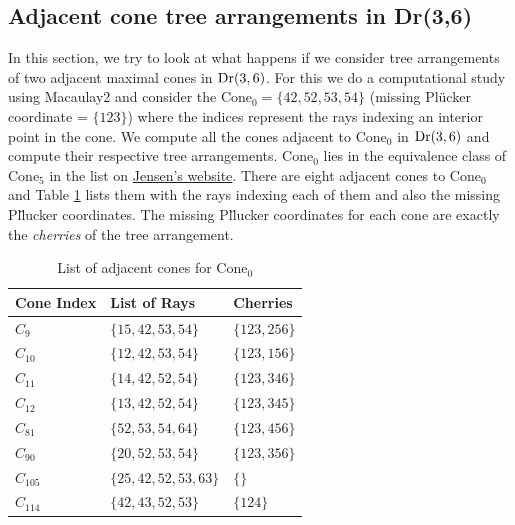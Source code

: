 \documentclass[12pt]{article}
\DeclareMathOperator{\Dr}{\rm Dr}
\theoremstyle{plain}
\theoremstyle{definition}
\numberwithin{subcase}{case}
\begin{document}
\subsection{Adjacent cone tree arrangements in Dr(3,6)}



In this section, we try to look at what happens if we consider tree arrangements of two adjacent maximal cones in $\Dr(3,6)$. For this we do a computational study using Macaulay2 \cite{M2} and consider the Cone$_{0} = \{ 42, 52, 53, 54 \}$ (missing Pl\"ucker coordinate = $\{123\}$) where the indices represent the rays indexing an interior point in the cone. We compute all the cones adjacent to Cone$_{0}$ in $\Dr(3,6)$ and compute their respective tree arrangements. Cone$_{0}$ lies in the equivalence class of Cone$_{5}$ in the list on \href{https://users-math.au.dk/jensen/Research/G3_7/grassmann3_6.html}{\color{blue}Jensen's website\color{black}}. There are eight adjacent cones to Cone$_{0}$ and Table \ref{tab:adjacent_cones_Dr(3,6)_0} lists them with the rays indexing each of them and also the missing Pl\"lucker coordinates. The missing Pl\"lucker coordinates for each cone are exactly the \emph{cherries} of the tree arrangement.   


\begin{table}[H]
    \centering
    \begin{tabular}{|p{2.5cm}|p{3cm}| p{3cm}|}
\hline
Cone Index & List of Rays & Cherries \\
\hline
$C_{9}$ & $\{15, 42, 53, 54\} $ & $\{ 123,256 \}$ \\
$C_{10}$ & $\{12, 42, 53, 54\} $ &  $\{ 123, 156\}$ \\
$C_{11}$ & $\{14, 42, 52, 54\} $ & $\{ 123, 346\}$ \\
$C_{12}$ & $\{13, 42, 52, 54\} $ & $\{ 123, 345\}$ \\
$C_{81}$ & $\{52, 53, 54, 64\} $ & $\{ 123, 456\}$ \\
$C_{90}$ & $\{20, 52, 53, 54\} $ & $\{ 123, 356\}$ \\
$C_{105}$ & $\{25, 42, 52, 53, 63\} $ & $\{\}$ \\
$C_{114}$ & $\{42, 43, 52, 53\} $ & $\{ 124\}$ \\
\hline
    \end{tabular}
    \caption{List of adjacent cones for Cone$_{0}$}
    \label{tab:adjacent_cones_Dr(3,6)_0}
\end{table}
\end{document}
